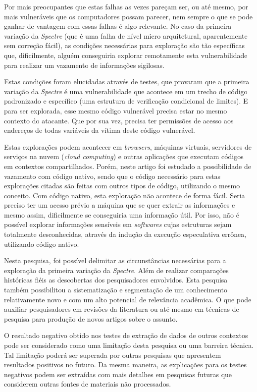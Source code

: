 \documentclass[conference]{IEEEtran}
\begin{document}
Por mais preocupantes que estas falhas as vezes pareçam ser, ou até mesmo, por mais vulneráveis que os computadores possam parecer, nem sempre o que se pode ganhar de vantagem com essas falhas é algo relevante. No caso da primeira variação da \emph{Spectre} (que é uma falha de nível micro arquitetural, aparentemente sem correção fácil), as condições necessárias para exploração são tão específicas que, dificilmente, alguém conseguiria explorar remotamente esta vulnerabilidade para realizar um vazamento de informações sigilosas.

Estas condições foram elucidadas através de testes, que provaram que a primeira variação da \emph{Spectre} é uma vulnerabilidade que acontece em um trecho de código padronizado e específico (uma estrutura de verificação condicional de limites). E para ser explorada, esse mesmo código vulnerável precisa estar no mesmo contexto do atacante. Que por sua vez, precisa ter permissões de acesso aos endereços de todas variáveis da vítima deste código vulnerável.

Estas explorações podem acontecer em \emph{browsers}, máquinas virtuais, servidores de serviços na nuvem (\emph{cloud computing}) e outras aplicações que executam códigos em contextos compartilhados. Porém, neste artigo foi estudado a possibilidade de vazamento com código nativo, sendo que o código necessário para estas explorações citadas são feitas com outros tipos de código, utilizando o mesmo conceito. Com código nativo, esta exploração não acontece de forma fácil. Seria preciso ter um acesso prévio a máquina que se quer extrair as informações e mesmo assim, dificilmente se conseguiria uma informação útil. Por isso, não é possível explorar informações sensíveis em \emph{softwares} cujas estruturas sejam totalmente desconhecidas, através da indução da execução especulativa errônea, utilizando código nativo.

Nesta pesquisa, foi possível delimitar as circunstâncias necessárias para a exploração da primeira variação da \emph{Spectre}. Além de realizar comparações históricas fiéis as descobertas dos pesquisadores envolvidos. Esta pesquisa também possibilitou a sistematização e segmentação de um conhecimento relativamente novo e com um alto potencial de relevância acadêmica. O que pode auxiliar pesquisadores em revisões da literatura ou até mesmo em técnicas de pesquisa para produção de novos artigos sobre o assunto.

O resultado negativo obtido nos testes de extração de dados de outros contextos pode ser considerado como uma limitação desta pesquisa ou uma barreira técnica. Tal limitação poderá ser superada por outras pesquisas que apresentem resultados positivos no futuro. Da mesma maneira, as explicações para os testes negativos podem ser extraídas com mais detalhes em pesquisas futuras que considerem outras fontes de materiais não processados.
\end{document}
